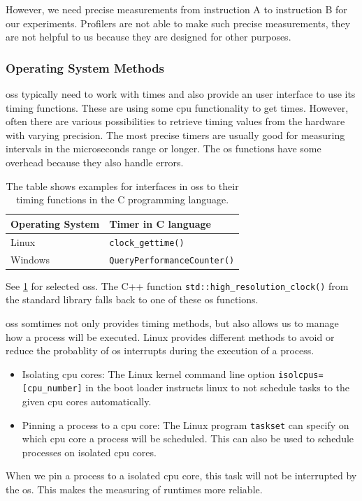 However, we need precise measurements from instruction A to instruction B for our experiments.
Profilers are not able to make such precise measurements, \ie they are not helpful to us because they are designed for other purposes.

\subsubsection{Operating System Methods}
\tobechecked
\acp{os} typically need to work with times and also provide an user interface to use its timing functions.
These are using some \ac{cpu} functionality to get times.
However, often there are various possibilities to retrieve timing values from the hardware with varying precision.
The most precise timers are usually good for measuring intervals in the microseconds range or longer.
The \ac{os} functions have some overhead because they also handle errors.
\begin{table}
    \centering
    \begin{tabular}{@{}ll@{}}
        \toprule
        Operating System & Timer in C language \\
        \midrule
        Linux & \lstinline|clock_gettime()| \\
        Windows & \lstinline|QueryPerformanceCounter()| \\
        \bottomrule
    \end{tabular}
    \caption[Operating System interfaces to their timing functions]
    {
        The table shows examples for interfaces in \acp{os} to their timing functions in the C programming language.
    }
    \label{tab:approach:timing_functions}
\end{table}
See \cref{tab:approach:timing_functions} for selected \acp{os}.
The C++ function \lstinline|std::high_resolution_clock()| from the standard library falls back to one of these \ac{os} functions.

\acp{os} somtimes not only provides timing methods, but also allows us to manage how a process will be executed.
Linux provides different methods to avoid or reduce the probablity of \ac{os} interrupts during the execution of a process.
\begin{itemize}
    \item Isolating \ac{cpu} cores: 
    The Linux kernel command line option \lstinline|isolcpus=[cpu_number]| in the boot loader instructs linux to not schedule tasks to the given \ac{cpu} cores automatically.
    \item Pinning a process to a \ac{cpu} core: 
    The Linux program \lstinline|taskset| can specify on which \ac{cpu} core a process will be scheduled.
    This can also be used to schedule processes on isolated \ac{cpu} cores.
\end{itemize}
When we pin a process to a isolated \ac{cpu} core, this task will not be interrupted by the \ac{os}.
This makes the measuring of runtimes more reliable.

